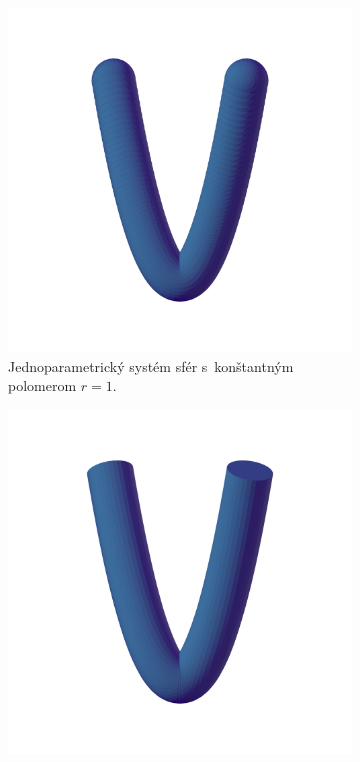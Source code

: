 \begin{figure}[h]
    \centering
    \captionsetup{justification=centering}
    \captionsetup[subfigure]{justification=centering}
    \begin{subfigure}[t]{0.49\textwidth}
        \centering
        \includegraphics[width=\textwidth, trim=0mm 50mm 0mm 100mm, clip=true]{images/bienert_constant_radius_spheres.png}
        	\caption{Jednoparametrický systém sfér s~konštantným polomerom $r=1$.}
        \label{fig:plocha1}
    \end{subfigure}
    \begin{subfigure}[t]{0.49\textwidth}
        \centering
        \includegraphics[width=\textwidth, trim=0mm 50mm 0mm 100mm, clip=true]{images/bienert_constant_radius_envelope.png}

\end{subfigure}
\end{figure}
